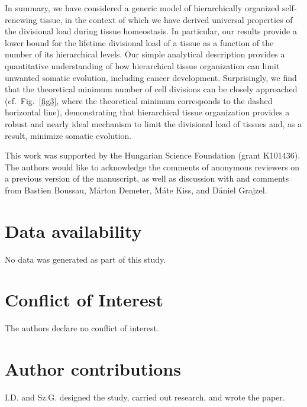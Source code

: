 \documentclass[aps,singlecolumn]{revtex4-1}
\begin{document}
In summary, we have considered a generic model of hierarchically
organized self-renewing tissue, in the context of which we have derived
universal properties of the divisional load during tissue homeostasis.
In particular, our results provide a lower bound for the
lifetime divisional load of a tissue as a function of the number of its
hierarchical levels.
Our simple analytical description provides a
quantitative understanding of how hierarchical tissue organization can
limit unwanted somatic evolution, including cancer development.
Surprisingly, we
find that the theoretical minimum number of cell divisions can be
closely approached (cf.\ Fig.~\ref{fig3}, where the theoretical minimum
corresponds to the dashed horizontal line), demonstrating that hierarchical
tissue organization
provides a robust and nearly ideal mechanism to limit the divisional
load of tissues and, as a result, minimize somatic evolution.


\begin{acknowledgments}

%
This work was supported by the Hungarian Science Foundation (grant K101436).
%
%
The authors would like to acknowledge the comments of anonymous
reviewers on a previous version of the manuscript, as well as discussion
with and comments from Bastien Boussau, M\'arton Demeter, M\'ate Kiss, and
D\'aniel Grajzel.
\end{acknowledgments}

\section*{Data availability}
No data was generated as part of this study.

\section*{Conflict of Interest}
The authors declare no conflict of interest.

\section*{Author contributions}

I.D. and Sz.G. designed the study, carried out research, and wrote the paper.
\end{document}
